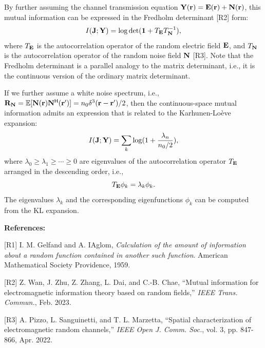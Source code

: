 \documentclass[a4paper,12pt]{article}
\newcommand{\blue}[1]{{\color{blue}{#1}}}
\def \H {^{\mathsf{H}}}
\begin{document}
{    \quad By further assuming the channel transmission equation ${\bf Y}({\bf r})={\bf E}({\bf r})+{\bf N}({\bf r})$, this mutual information can be expressed in the Fredholm determinant [R2] form:
    \begin{equation}
        I({\bf J}; {\bf Y})=\log\det({\bf 1}+T_{\bf E}T_{\bf N}^{-1}),
    \end{equation}
    where $T_{\bf E}$ is the autocorrelation operator of the random electric field ${\bf E}$, and $T_{\bf N}$ is the autocorrelation operator of the random noise field ${\bf N}$ [R3]. Note that the Fredholm determinant is a parallel analogy to the matrix determinant, i.e., it is the continuous version of the ordinary matrix determinant. 

    \quad If we further assume a white noise spectrum, i.e., ${\bf R}_{\bf N}=\mathbb{E}[{\bf N}({\bf r}){\bf N}\H({\bf r}')]=n_0\delta^3({\bf r}-{\bf r}')/2$, then the continuous-space mutual information admits an expression that is related to the Karhunen-Lo\`{e}ve expansion: 
    \begin{equation}
        I({\bf J}; {\bf Y})=\sum_k \log(1+\frac{\lambda_n}{n_0/2}),
    \end{equation}
    where $\lambda_0\geq \lambda_1\geq\cdots \geq 0$ are eigenvalues of the autocorrelation operator $T_{\bf E}$ arranged in the descending order, i.e., 
    \begin{equation}
        T_{\bf E}\phi_k = \lambda_k\phi_k.
    \end{equation} 
    The eigenvalues $\lambda_k$ and the corresponding eigenfunctions $\phi_k$ can be computed from the KL expansion. 
    
    {\bf References:}

    [R1] I. M. Gelfand and A. IAglom, {\it Calculation of the amount of information about a random function contained in another such function}. American Mathematical Society Providence, 1959. 

    [R2] Z. Wan, J. Zhu, Z. Zhang, L. Dai, and C.-B. Chae, ``Mutual information for electromagnetic information theory based on random fields,'' {\it IEEE Trans. Commun.}, Feb. 2023. 

    [R3] A. Pizzo, L. Sanguinetti, and T. L. Marzetta, ``Spatial characterization of electromagnetic random channels,'' {\it IEEE Open J. Comm. Soc.}, vol. 3, pp. 847-866, Apr. 2022. 

}

\blue{
    \quad In the revised version of this paper, we have addressed this issue as 
}
\end{document}
